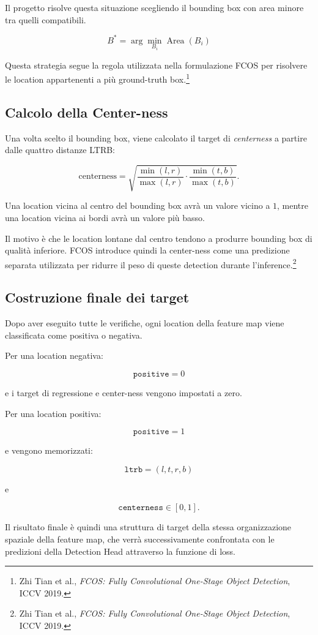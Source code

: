 Il progetto risolve questa situazione scegliendo il bounding box con area
minore tra quelli compatibili.

\[
B^*=\arg\min_{B_i} \operatorname{Area}(B_i)
\]

Questa strategia segue la regola utilizzata nella formulazione FCOS per
risolvere le location appartenenti a più ground-truth box.\footnote{Zhi Tian
et al., \textit{FCOS: Fully Convolutional One-Stage Object Detection},
ICCV 2019.}

\subsection{Calcolo della Center-ness}

Una volta scelto il bounding box, viene calcolato il target di
\textit{centerness} a partire dalle quattro distanze LTRB:

\[
\text{centerness}
=
\sqrt{
\frac{\min(l,r)}{\max(l,r)}
\cdot
\frac{\min(t,b)}{\max(t,b)}
}.
\]

Una location vicina al centro del bounding box avrà un valore vicino a $1$,
mentre una location vicina ai bordi avrà un valore più basso.

Il motivo è che le location lontane dal centro tendono a produrre bounding box
di qualità inferiore. FCOS introduce quindi la center-ness come una predizione
separata utilizzata per ridurre il peso di queste detection durante
l'inference.\footnote{Zhi Tian et al., \textit{FCOS: Fully Convolutional
One-Stage Object Detection}, ICCV 2019.}

\subsection{Costruzione finale dei target}

Dopo aver eseguito tutte le verifiche, ogni location della feature map viene
classificata come positiva o negativa.

Per una location negativa:

\[
\texttt{positive}=0
\]

e i target di regressione e center-ness vengono impostati a zero.

Per una location positiva:

\[
\texttt{positive}=1
\]

e vengono memorizzati:

\[
\texttt{ltrb}=(l,t,r,b)
\]

e

\[
\texttt{centerness}\in[0,1].
\]

Il risultato finale è quindi una struttura di target della stessa
organizzazione spaziale della feature map, che verrà successivamente
confrontata con le predizioni della Detection Head attraverso la funzione di
loss.